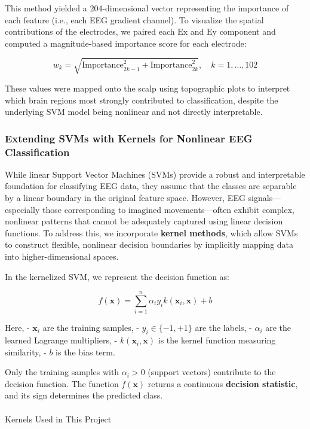 \documentclass[
  letterpaper,
  DIV=11,
  numbers=noendperiod]{scrartcl}
\makeatletter
\let\oldparagraph\paragraph
\renewcommand{\paragraph}{
    \@ifstar
      \xxxParagraphStar
      \xxxParagraphNoStar
  }
\newcommand{\xxxParagraphStar}[1]{\oldparagraph*{#1}\mbox{}}
\newcommand{\xxxParagraphNoStar}[1]{\oldparagraph{#1}\mbox{}}
\makeatother
\begin{document}
This method yielded a 204-dimensional vector representing the importance
of each feature (i.e., each EEG gradient channel). To visualize the
spatial contributions of the electrodes, we paired each \(\text{Ex}\)
and \(\text{Ey}\) component and computed a magnitude-based importance
score for each electrode:

\[
w_k = \sqrt{\text{Importance}_{2k-1}^2 + \text{Importance}_{2k}^2}, \quad k = 1, \dots, 102
\]

These values were mapped onto the scalp using topographic plots to
interpret which brain regions most strongly contributed to
classification, despite the underlying SVM model being nonlinear and not
directly interpretable.

\subsubsection{Extending SVMs with Kernels for Nonlinear EEG
Classification}\label{extending-svms-with-kernels-for-nonlinear-eeg-classification}

While linear Support Vector Machines (SVMs) provide a robust and
interpretable foundation for classifying EEG data, they assume that the
classes are separable by a linear boundary in the original feature
space. However, EEG signals---especially those corresponding to imagined
movements---often exhibit complex, nonlinear patterns that cannot be
adequately captured using linear decision functions. To address this, we
incorporate \textbf{kernel methods}, which allow SVMs to construct
flexible, nonlinear decision boundaries by implicitly mapping data into
higher-dimensional spaces.

In the kernelized SVM, we represent the decision function as:

\[
f(\mathbf{x}) = \sum_{i=1}^{n} \alpha_i y_i k(\mathbf{x}_i, \mathbf{x}) + b
\]

Here, - \(\mathbf{x}_i\) are the training samples, -
\(y_i \in \{-1, +1\}\) are the labels, - \(\alpha_i\) are the learned
Lagrange multipliers, - \(k(\mathbf{x}_i, \mathbf{x})\) is the kernel
function measuring similarity, - \(b\) is the bias term.

Only the training samples with \(\alpha_i > 0\) (support vectors)
contribute to the decision function. The function \(f(\mathbf{x})\)
returns a continuous \textbf{decision statistic}, and its sign
determines the predicted class.

\paragraph{Kernels Used in This
Project}\label{kernels-used-in-this-project}
\end{document}
